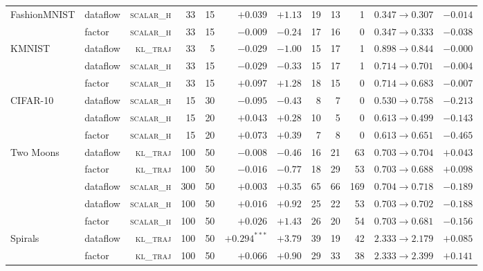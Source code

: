 \begin{table}[t]
\begin{tabular}{@{}llrrrrrrrrrr@{}}
\midrule
\multirow{2}{*}{FashionMNIST}
  & dataflow & \textsc{scalar\_h}  &  33 & 15 & $+0.039$        & $+1.13$ & 19 & 13 &   1 & $0.347{\to}0.307$ & $-0.014$ \\
  & factor   & \textsc{scalar\_h}  &  33 & 15 & $-0.009$        & $-0.24$ & 17 & 16 &   0 & $0.347{\to}0.333$ & $-0.038$ \\
\midrule
\multirow{3}{*}{KMNIST}
  & dataflow & \textsc{kl\_traj}   &  33 &  5 & $-0.029$        & $-1.00$ & 15 & 17 &   1 & $0.898{\to}0.844$ & $-0.000$ \\
  & dataflow & \textsc{scalar\_h}  &  33 & 15 & $-0.029$        & $-0.33$ & 15 & 17 &   1 & $0.714{\to}0.701$ & $-0.004$ \\
  & factor   & \textsc{scalar\_h}  &  33 & 15 & $+0.097$        & $+1.28$ & 18 & 15 &   0 & $0.714{\to}0.683$ & $-0.007$ \\
\midrule
\multirow{3}{*}{CIFAR-10}
  & dataflow & \textsc{scalar\_h}  &  15 & 30 & $-0.095$        & $-0.43$ &  8 &  7 &   0 & $0.530{\to}0.758$ & $-0.213$ \\
  & dataflow & \textsc{scalar\_h}  &  15 & 20 & $+0.043$        & $+0.28$ & 10 &  5 &   0 & $0.613{\to}0.499$ & $-0.143$ \\
  & factor   & \textsc{scalar\_h}  &  15 & 20 & $+0.073$        & $+0.39$ &  7 &  8 &   0 & $0.613{\to}0.651$ & $-0.465$ \\
\midrule
\multirow{5}{*}{Two Moons}
  & dataflow & \textsc{kl\_traj}   & 100 & 50 & $-0.008$        & $-0.46$ & 16 & 21 &  63 & $0.703{\to}0.704$ & $+0.043$ \\
  & factor   & \textsc{kl\_traj}   & 100 & 50 & $-0.016$        & $-0.77$ & 18 & 29 &  53 & $0.703{\to}0.688$ & $+0.098$ \\
  & dataflow & \textsc{scalar\_h}  & 300 & 50 & $+0.003$        & $+0.35$ & 65 & 66 & 169 & $0.704{\to}0.718$ & $-0.189$ \\
  & dataflow & \textsc{scalar\_h}  & 100 & 50 & $+0.016$        & $+0.92$ & 25 & 22 &  53 & $0.703{\to}0.702$ & $-0.188$ \\
  & factor   & \textsc{scalar\_h}  & 100 & 50 & $+0.026$        & $+1.43$ & 26 & 20 &  54 & $0.703{\to}0.681$ & $-0.156$ \\
\midrule
\multirow{5}{*}{Spirals}
  & dataflow & \textsc{kl\_traj}   & 100 & 50 & $+0.294^{***}$  & $+3.79$ & 39 & 19 &  42 & $2.333{\to}2.179$ & $+0.085$ \\
  & factor   & \textsc{kl\_traj}   & 100 & 50 & $+0.066$        & $+0.90$ & 29 & 33 &  38 & $2.333{\to}2.399$ & $+0.141$ \\

\end{tabular}
\end{table}
